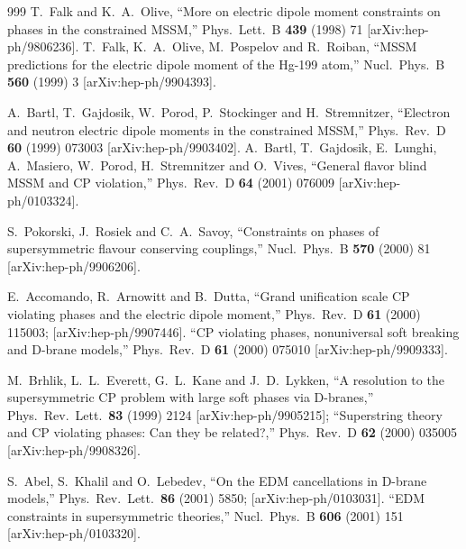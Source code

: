 \begin{thebibliography}{999}
  T.~Falk and K.~A.~Olive,
  ``More on electric dipole moment constraints on phases in the constrained
 MSSM,''
  Phys.\ Lett.\ B {\bf 439} (1998) 71
  [arXiv:hep-ph/9806236].
  T.~Falk, K.~A.~Olive, M.~Pospelov and R.~Roiban,
  ``MSSM predictions for the electric dipole moment of the Hg-199 atom,''
  Nucl.\ Phys.\ B {\bf 560} (1999) 3
  [arXiv:hep-ph/9904393].

  A.~Bartl, T.~Gajdosik, W.~Porod, P.~Stockinger and H.~Stremnitzer,
  ``Electron and neutron electric dipole moments in the constrained MSSM,''
  Phys.\ Rev.\ D {\bf 60} (1999) 073003
  [arXiv:hep-ph/9903402].
 A.~Bartl, T.~Gajdosik, E.~Lunghi, A.~Masiero, W.~Porod, H.~Stremnitzer and O.~Vives,
  ``General flavor blind MSSM and CP violation,''
  Phys.\ Rev.\ D {\bf 64} (2001) 076009
  [arXiv:hep-ph/0103324].

  S.~Pokorski, J.~Rosiek and C.~A.~Savoy,
  ``Constraints on phases of supersymmetric flavour conserving couplings,''
  Nucl.\ Phys.\ B {\bf 570} (2000) 81
  [arXiv:hep-ph/9906206].

  E.~Accomando, R.~Arnowitt and B.~Dutta,
  ``Grand unification scale CP violating phases and the electric dipole
  moment,''
  Phys.\ Rev.\ D {\bf 61} (2000) 115003;
  [arXiv:hep-ph/9907446].
  ``CP violating phases, nonuniversal soft breaking and D-brane models,''
  Phys.\ Rev.\ D {\bf 61} (2000) 075010
  [arXiv:hep-ph/9909333].

  M.~Brhlik, L.~L.~Everett, G.~L.~Kane and J.~D.~Lykken,
  ``A resolution to the supersymmetric CP problem with large soft phases  via
  D-branes,''
  Phys.\ Rev.\ Lett.\  {\bf 83} (1999) 2124
  [arXiv:hep-ph/9905215];
  ``Superstring theory and CP violating phases: Can they be related?,''
  Phys.\ Rev.\ D {\bf 62} (2000) 035005
  [arXiv:hep-ph/9908326].

  S.~Abel, S.~Khalil and O.~Lebedev,
  ``On the EDM cancellations in D-brane models,''
  Phys.\ Rev.\ Lett.\  {\bf 86} (2001) 5850;
  [arXiv:hep-ph/0103031].
 ``EDM constraints in supersymmetric theories,''
  Nucl.\ Phys.\ B {\bf 606} (2001) 151
  [arXiv:hep-ph/0103320].


\end{thebibliography}

